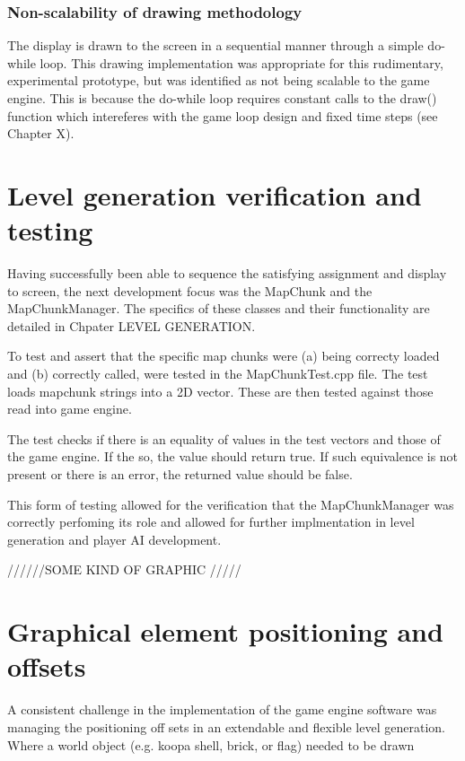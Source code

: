 \documentclass[11pt, a4paper, oneside]{report} %
\begin{document}
\subsubsection{Non-scalability of drawing methodology}

The display is drawn to the screen in a sequential manner through a simple do-
while loop. This drawing implementation was appropriate for this rudimentary,
experimental prototype, but was identified as not being scalable to the game
engine. This is because the do-while loop requires constant calls to the draw()
function which intereferes with the game loop design and fixed time steps (see
Chapter X).

\section{Level generation verification and testing}

Having successfully been able to sequence the satisfying assignment and display
to screen, the next development focus was the MapChunk and the MapChunkManager.
The specifics of these classes and their functionality are detailed in Chpater
LEVEL GENERATION.

To test and assert that the specific map chunks were (a) being correcty loaded
and (b) correctly called, were tested in the MapChunkTest.cpp file. The test
loads mapchunk strings into a 2D vector. These are then tested against those
read into game engine. 

The test checks if there is an equality of values in the test vectors and those
of the game engine. If the so, the value should return true. If such equivalence
is not present or there is an error, the returned value should be false.

This form of testing allowed for the verification that the MapChunkManager was
correctly perfoming its role and allowed for further implmentation in level
generation and player AI development.

//////SOME KIND OF GRAPHIC /////

\section{Graphical element positioning and offsets}

A consistent challenge in the implementation of the game engine software was
managing the positioning off sets in an extendable and flexible level
generation. Where a world object (e.g. koopa shell, brick, or flag) needed to be drawn
\end{document}
